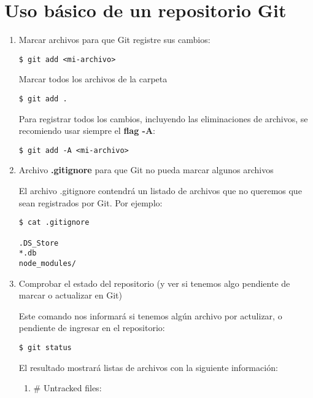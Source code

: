 \documentclass[a4paper,oneside]{article}
\begin{document}
\section{Uso básico de un repositorio Git}
\begin{enumerate}

  \item Marcar archivos para que Git registre sus cambios:

    \begin{verbatim}
$ git add <mi-archivo>
    \end{verbatim}

Marcar todos los archivos de la carpeta

    \begin{verbatim}
$ git add .
    \end{verbatim}

Para registrar todos los cambios, incluyendo las eliminaciones de archivos, se recomiendo usar siempre el \textbf{flag -A}:

    \begin{verbatim}
$ git add -A <mi-archivo>
    \end{verbatim}

  \item Archivo \textbf{.gitignore} para que Git no pueda marcar algunos archivos

El archivo .gitignore contendrá un listado de archivos que no queremos que sean registrados por Git. Por ejemplo:

    \begin{verbatim}
$ cat .gitignore

.DS_Store
*.db
node_modules/
    \end{verbatim}

  \item Comprobar el estado del repositorio (y ver si tenemos algo pendiente de marcar o actualizar en Git)

Este comando nos informará si tenemos algún archivo por actulizar, o pendiente de ingresar en el repositorio:

    \begin{verbatim}
$ git status
    \end{verbatim}

El resultado mostrará listas de archivos con la siguiente información:
    \begin{enumerate}
      \item \# Untracked files:


\end{enumerate}
\end{enumerate}
\end{document}
